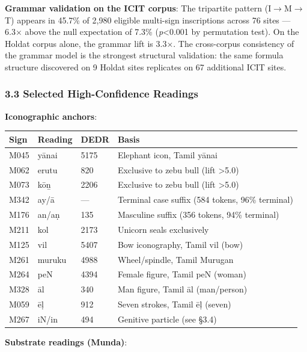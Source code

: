 \documentclass[
  11pt,
]{article}
\newcounter{none} %
\begin{document}
\textbf{Grammar validation on the ICIT corpus}: The tripartite
pattern (I$\to$M$\to$T) appears in 45.7\% of 2,980 eligible multi-sign
inscriptions across 76 sites --- 6.3× above the null expectation of
7.3\% (\emph{p}\textless0.001 by permutation test). On the Holdat corpus
alone, the grammar lift is 3.3×. The cross-corpus consistency of the
grammar model is the strongest structural validation: the same formula
structure discovered on 9 Holdat sites replicates on 67 additional
ICIT sites.

\subsubsection{3.3 Selected High-Confidence
Readings}\label{selected-high-confidence-readings}

\textbf{Iconographic anchors}:

{\def\LTcaptype{none} %
\begin{longtable}[]{@{}llll@{}}
\toprule\noalign{}
Sign & Reading & DEDR & Basis \\
\midrule\noalign{}
\endhead
\bottomrule\noalign{}
\endlastfoot
M045 & yānai & 5175 & Elephant icon, Tamil yānai \\
M062 & erutu & 820 & Exclusive to zebu bull (lift \textgreater5.0) \\
M073 & kōṉ & 2206 & Exclusive to zebu bull (lift \textgreater5.0) \\
M342 & ay/ā & --- & Terminal case suffix (584 tokens, 96\% terminal) \\
M176 & an/aṇ & 135 & Masculine suffix (356 tokens, 94\% terminal) \\
M211 & kol & 2173 & Unicorn seals exclusively \\
M125 & vil & 5407 & Bow iconography, Tamil vil (bow) \\
M261 & muruku & 4988 & Wheel/spindle, Tamil Murugan \\
M264 & peN & 4394 & Female figure, Tamil peN (woman) \\
M328 & āl & 340 & Man figure, Tamil āl (man/person) \\
M059 & ēḷ & 912 & Seven strokes, Tamil ēḷ (seven) \\
M267 & iN/in & 494 & Genitive particle (see §3.4) \\
\end{longtable}
}

\textbf{Substrate readings (Munda)}:
\end{document}
